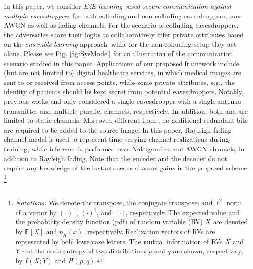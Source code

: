 \documentclass[conference]{IEEEtran}
\newcommand{\E}{\ensuremath{\mathbb E}}
\begin{document}
		In this paper, we consider  \emph{E2E learning-based   secure communication  against  multiple eavesdroppers} for both colluding and non-colluding eavesdroppers,  over AWGN as well as  fading channels.  
For the  scenario of colluding  eavesdroppers, the adversaries share their logits to collaboratively infer private attributes based on  the \textit{ensemble learning} approach, while for   the  {non-colluding} setup  they act alone.   
	Please see Fig. \ref{fig:SysModel} for an illustration of the communication scenario studied in this paper.  
	Applications of our proposed framework include  (but are not limited to) 
	digital healthcare services, in which medical images   are sent to or received from  access points, while some private attributes, e.g., the identity of  patients should be kept  secret from potential eavesdroppers.  
	Notably, previous works \cite{AE-Deniz} and \cite{Ecenaz-icassp}  only considered a single eavesdropper with a single-antenna transmitter and multiple parallel channels, respectively. 
	In addition, both  \cite{AE-Deniz} and \cite{Ecenaz-icassp} are limited to static channels.  
	Moreover,  different from \cite{Eduard-AE}, no additional 
	redundant bits are required to be added to the source image.  
{In this paper, Rayleigh fading channel model is used  to represent time-varying  channel realizations during training, while  inference is performed over Nakagami-$m$ and AWGN channels, %
in addition to Rayleigh fading. 
Note that the encoder and the decoder  do not require any knowledge of the instantaneous channel gains in the proposed scheme.}	\footnote{\textit{Notations:} We denote the transpose, the conjugate transpose,  and $\ell^2$ norm of a vector by $(\cdot)^\mathsf{T}$, $(\cdot)^\dagger$,  and $||\cdot||$, respectively. 
The expected value and the probability density function (pdf) 
of random variable (RV) ${X}$ are denoted by $\E[{X}]$ and $p_X(x)$, 
respectively.  
Realization vectors of RVs are represented by bold lowercase letters. 
The mutual information of RVs ${X}$ and ${Y}$ and the cross-entropy  of two distributions $p$ and $q$ are shown, respectively, by $I({X};{Y})$ and $H(p,q)$.  
}
 
\end{document}
